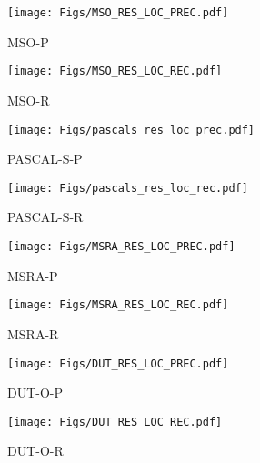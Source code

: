 \documentclass[10pt,twocolumn,letterpaper]{article}
\begin{document}
\begin{figure*}[t]
    \centering
    \begin{subfigure}[b]{0.12\textwidth}
        \texttt{[image: Figs/MSO\_RES\_LOC\_PREC.pdf]}
        \caption{{\scriptsize MSO-P}}
    \end{subfigure}
    \hspace{-0.2cm}
    \begin{subfigure}[b]{0.12\textwidth}
        \texttt{[image: Figs/MSO\_RES\_LOC\_REC.pdf]}
        \caption{{\scriptsize MSO-R}}
    \end{subfigure}
    \hspace{-0.2cm}
    \begin{subfigure}[b]{0.12\textwidth}
        \texttt{[image: Figs/pascals\_res\_loc\_prec.pdf]}
        \caption{{\scriptsize PASCAL-S-P}}
    \end{subfigure}
        \hspace{-0.2cm}
    \begin{subfigure}[b]{0.12\textwidth}
        \texttt{[image: Figs/pascals\_res\_loc\_rec.pdf]}
        \caption{{\scriptsize PASCAL-S-R}}
    \end{subfigure}    
    \hspace{-0.2cm}
    \begin{subfigure}[b]{0.12\textwidth}
        \texttt{[image: Figs/MSRA\_RES\_LOC\_PREC.pdf]}
        \caption{{\scriptsize MSRA-P}}
    \end{subfigure}
        \hspace{-0.2cm}
        \begin{subfigure}[b]{0.12\textwidth}
        \texttt{[image: Figs/MSRA\_RES\_LOC\_REC.pdf]}
        \caption{{\scriptsize MSRA-R}}
    \end{subfigure}
        \hspace{-0.2cm}
        \begin{subfigure}[b]{0.12\textwidth}
        \texttt{[image: Figs/DUT\_RES\_LOC\_PREC.pdf]}
        \caption{{\scriptsize DUT-O-P}}
    \end{subfigure}
        \hspace{-0.25cm}
        \begin{subfigure}[b]{0.17\textwidth}
        \texttt{[image: Figs/DUT\_RES\_LOC\_REC.pdf]}
        \caption{{\scriptsize DUT-O-R}}
    \end{subfigure}
    \hspace{-0.2cm}

\end{figure*}
\end{document}
